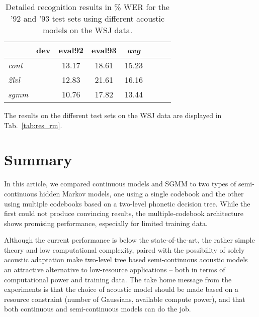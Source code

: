 \documentclass{article}
\begin{document}
\begin{table}%
\begin{center}
\begin{tabular}{|l||c|c|c|c|c|c||c|}
\hline
~          &    dev & eval92 & eval93 & {\em avg} \\ \hline\hline
{\em cont} &        &  13.17 &  18.61 &     15.23 \\ \hline


{\em 2lvl} &        &  12.83 &  21.61 &     16.16 \\ \hline

{\em sgmm} &        &  10.76 &  17.82 &     13.44 \\ \hline
\end{tabular}
\end{center}
\caption{\label{tab:res_wsj}
Detailed recognition results in \% WER for the '92 and '93 test sets using 
different acoustic models on the WSJ data.
}
\end{table}

The results on the different test sets on the WSJ data are displayed in
Tab.~\ref{tab:res_rm}.

\section{Summary}
In this article, we compared continuous models and SGMM to 
two types of semi-continuous hidden Markov models, one using a single codebook 
and the other using multiple codebooks based on a two-level phonetic decision tree.
%
While the first could not produce convincing results, the multiple-codebook 
architecture shows promising performance, especially for limited training data. 

Although the current performance is below the state-of-the-art, the
rather simple theory and low computational complexity, paired with the possibility
of solely acoustic adaptation make two-level tree based semi-continuous acoustic
models an attractive alternative to low-resource applications -- both in terms
of computational power and training data.
%
The take home message from the experiments is that the choice of acoustic model
should be made based on a resource constraint (number of Gaussians, available
compute power), and that both continuous and semi-continuous models can do the job.
\end{document}
